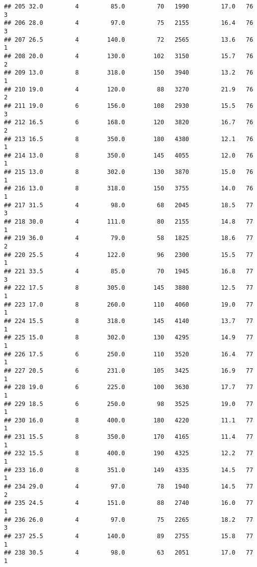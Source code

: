 \documentclass[
]{article}
\begin{document}
\begin{verbatim}
## 205 32.0         4         85.0         70   1990         17.0   76      3
## 206 28.0         4         97.0         75   2155         16.4   76      3
## 207 26.5         4        140.0         72   2565         13.6   76      1
## 208 20.0         4        130.0        102   3150         15.7   76      2
## 209 13.0         8        318.0        150   3940         13.2   76      1
## 210 19.0         4        120.0         88   3270         21.9   76      2
## 211 19.0         6        156.0        108   2930         15.5   76      3
## 212 16.5         6        168.0        120   3820         16.7   76      2
## 213 16.5         8        350.0        180   4380         12.1   76      1
## 214 13.0         8        350.0        145   4055         12.0   76      1
## 215 13.0         8        302.0        130   3870         15.0   76      1
## 216 13.0         8        318.0        150   3755         14.0   76      1
## 217 31.5         4         98.0         68   2045         18.5   77      3
## 218 30.0         4        111.0         80   2155         14.8   77      1
## 219 36.0         4         79.0         58   1825         18.6   77      2
## 220 25.5         4        122.0         96   2300         15.5   77      1
## 221 33.5         4         85.0         70   1945         16.8   77      3
## 222 17.5         8        305.0        145   3880         12.5   77      1
## 223 17.0         8        260.0        110   4060         19.0   77      1
## 224 15.5         8        318.0        145   4140         13.7   77      1
## 225 15.0         8        302.0        130   4295         14.9   77      1
## 226 17.5         6        250.0        110   3520         16.4   77      1
## 227 20.5         6        231.0        105   3425         16.9   77      1
## 228 19.0         6        225.0        100   3630         17.7   77      1
## 229 18.5         6        250.0         98   3525         19.0   77      1
## 230 16.0         8        400.0        180   4220         11.1   77      1
## 231 15.5         8        350.0        170   4165         11.4   77      1
## 232 15.5         8        400.0        190   4325         12.2   77      1
## 233 16.0         8        351.0        149   4335         14.5   77      1
## 234 29.0         4         97.0         78   1940         14.5   77      2
## 235 24.5         4        151.0         88   2740         16.0   77      1
## 236 26.0         4         97.0         75   2265         18.2   77      3
## 237 25.5         4        140.0         89   2755         15.8   77      1
## 238 30.5         4         98.0         63   2051         17.0   77      1

\end{verbatim}
\end{document}
